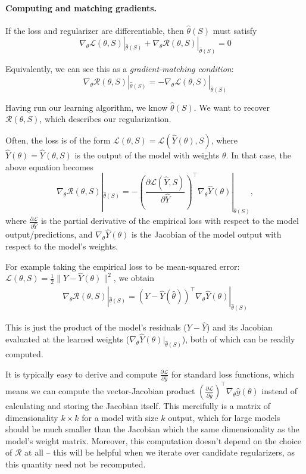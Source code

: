 \documentclass[10pt]{article}
\begin{document}
\paragraph{Computing and matching gradients.} If the loss and regularizer are differentiable, then $\hat\theta(S)$ must satisfy
\begin{equation}\label{eq:stationarity} 
\nabla_\theta \mathcal{L}({\theta},S)|_{\hat\theta(S)}
+
\nabla_\theta \mathcal{R}({\theta},S)|_{\hat\theta(S)}
=0    
\end{equation}

Equivalently, we can see this as a \emph{gradient-matching condition}:
\begin{equation}\label{eq:grad-matching} 
\nabla_\theta \mathcal{R}({\theta},S)|_{\hat\theta(S)}
= -\nabla_\theta \mathcal{L}({\theta},S)|_{\hat\theta(S)}
\end{equation}

Having run our learning algorithm, we know $\hat\theta(S)$. 
We want to recover
 $\mathcal{R}(\theta,S)$, which describes our regularization.

Often, the loss is of the form $\mathcal{L}(\theta,S) = \mathcal{L}(\hat{Y}(\theta),S)$, where $\hat{Y}(\theta)=\hat{Y}(\theta,S)$ is the output of the model with weights $\theta$.
In that case, the above equation becomes
\[ \nabla_\theta \mathcal{R}({\theta},S)|_{\hat\theta(S)} 
= -\left(\frac{\partial \mathcal{L}(\hat{Y},S)}{\partial\hat{Y}}\right)^\top  
\nabla_\theta{\hat{Y}}({\theta})|_{\hat\theta(S)},\]
where $\frac{\partial \mathcal{L}}{\partial\hat{Y}}$ is the partial derivative of the empirical loss with respect to the model output/predictions, and $\nabla_\theta{\hat{Y}}({\theta})$ is the Jacobian of the model output with respect to the model's weights.

For example taking the empirical loss to be mean-squared error:
$\mathcal{L}(\theta,S)= \frac{1}{2} \|{Y} - {\hat{Y}}({\theta})\|^2$, we obtain
\begin{align*}
    \nabla_\theta \mathcal{R}({\theta},S) |_{\hat\theta(S)} = ({Y} - {\hat{Y}}({\hat{\theta}}))^\top  \nabla_\theta{\hat{Y}}({\theta})|_{\hat\theta(S)}
\end{align*}

This is just the product of the model's residuals (${Y} - {\hat{Y}}$) and its Jacobian evaluated at the learned weights ($\nabla_\theta{\hat{Y}}({\theta})|_{\hat\theta(S)}$), both of which can be readily computed.


It is typically easy to derive and compute $\frac{\partial \mathcal{L}}{\partial\hat{ y}}$ for standard loss functions, which means we can compute the vector-Jacobian product $(\frac{\partial \mathcal{L}}{\partial\hat{ y}})^\top  \nabla_\theta{\hat{y}}({\theta})$ instead of calculating and storing the Jacobian itself. This mercifully is a matrix of dimensionality $k \times k$ for a model with size $k$ output, which for large models should be much smaller than the Jacobian which the same dimensionality as the model's weight matrix. Moreover, this computation doesn't depend on the choice of $\mathcal{R}$ at all -- this will be helpful when we iterate over candidate regularizers, as this quantity need not be recomputed. 
\end{document}
